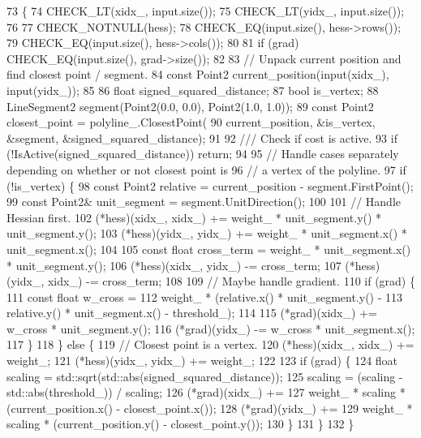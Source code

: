 \begin{DoxyCode}
73                                                                     \{
74   CHECK\_LT(xidx\_, input.size());
75   CHECK\_LT(yidx\_, input.size());
76 
77   CHECK\_NOTNULL(hess);
78   CHECK\_EQ(input.size(), hess->rows());
79   CHECK\_EQ(input.size(), hess->cols());
80 
81   \textcolor{keywordflow}{if} (grad) CHECK\_EQ(input.size(), grad->size());
82 
83   \textcolor{comment}{// Unpack current position and find closest point / segment.}
84   \textcolor{keyword}{const} Point2 current\_position(input(xidx\_), input(yidx\_));
85 
86   \textcolor{keywordtype}{float} signed\_squared\_distance;
87   \textcolor{keywordtype}{bool} is\_vertex;
88   LineSegment2 segment(Point2(0.0, 0.0), Point2(1.0, 1.0));
89   \textcolor{keyword}{const} Point2 closest\_point = polyline\_.ClosestPoint(
90       current\_position, &is\_vertex, &segment, &signed\_squared\_distance);
91 \textcolor{comment}{}
92 \textcolor{comment}{  /// Check if cost is active.}
93 \textcolor{comment}{}  \textcolor{keywordflow}{if} (!IsActive(signed\_squared\_distance)) \textcolor{keywordflow}{return};
94 
95   \textcolor{comment}{// Handle cases separately depending on whether or not closest point is}
96   \textcolor{comment}{// a vertex of the polyline.}
97   \textcolor{keywordflow}{if} (!is\_vertex) \{
98     \textcolor{keyword}{const} Point2 relative = current\_position - segment.FirstPoint();
99     \textcolor{keyword}{const} Point2& unit\_segment = segment.UnitDirection();
100 
101     \textcolor{comment}{// Handle Hessian first.}
102     (*hess)(xidx\_, xidx\_) += weight\_ * unit\_segment.y() * unit\_segment.y();
103     (*hess)(yidx\_, yidx\_) += weight\_ * unit\_segment.x() * unit\_segment.x();
104 
105     \textcolor{keyword}{const} \textcolor{keywordtype}{float} cross\_term = weight\_ * unit\_segment.x() * unit\_segment.y();
106     (*hess)(xidx\_, yidx\_) -= cross\_term;
107     (*hess)(yidx\_, xidx\_) -= cross\_term;
108 
109     \textcolor{comment}{// Maybe handle gradient.}
110     \textcolor{keywordflow}{if} (grad) \{
111       \textcolor{keyword}{const} \textcolor{keywordtype}{float} w\_cross =
112           weight\_ * (relative.x() * unit\_segment.y() -
113                      relative.y() * unit\_segment.x() - threshold\_);
114 
115       (*grad)(xidx\_) += w\_cross * unit\_segment.y();
116       (*grad)(yidx\_) -= w\_cross * unit\_segment.x();
117     \}
118   \} \textcolor{keywordflow}{else} \{
119     \textcolor{comment}{// Closest point is a vertex.}
120     (*hess)(xidx\_, xidx\_) += weight\_;
121     (*hess)(yidx\_, yidx\_) += weight\_;
122 
123     \textcolor{keywordflow}{if} (grad) \{
124       \textcolor{keywordtype}{float} scaling = std::sqrt(std::abs(signed\_squared\_distance));
125       scaling = (scaling - std::abs(threshold\_)) / scaling;
126       (*grad)(xidx\_) +=
127           weight\_ * scaling * (current\_position.x() - closest\_point.x());
128       (*grad)(yidx\_) +=
129           weight\_ * scaling * (current\_position.y() - closest\_point.y());
130     \}
131   \}
132 \}
\end{DoxyCode}


